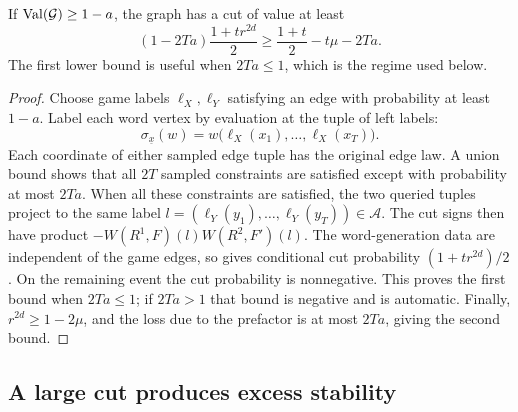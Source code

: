 \begin{lemma}[Completeness]\label{lem:completeness}
If $\operatorname{Val}(\mathcal G)\ge1-a$, the graph has a cut of value at least
\begin{equation}\label{eq:completeness}
 (1-2Ta)\frac{1+t r^{2d}}2
 \ge\frac{1+t}{2}-t\mu-2Ta.
\end{equation}
The first lower bound is useful when $2Ta\le1$, which is the regime used
below.
\end{lemma}

\begin{proof}
Choose game labels $\ell_X,\ell_Y$ satisfying an edge with probability at
least $1-a$. Label each word vertex by evaluation at the tuple of left
labels:
\[
 \sigma_{\underline x}(w)=
 w\bigl(\ell_X(x_1),\ldots,\ell_X(x_T)\bigr).
\]
Each coordinate of either sampled edge tuple has the original edge law.
A union bound shows that all $2T$ sampled constraints are satisfied except
with probability at most $2Ta$. When all these constraints are satisfied,
the two queried tuples
project to the same label
$l=(\ell_Y(y_1),\ldots,\ell_Y(y_T))\in\mathcal A$.
The cut signs then have product
$-W(R^1,F)(l)W(R^2,F')(l)$. The word-generation data are independent of
the game edges, so  gives conditional cut
probability $(1+t r^{2d})/2$. On the remaining event the cut probability
is nonnegative. This proves the first bound when $2Ta\le1$; if $2Ta>1$
that bound is negative and is automatic. Finally,
$r^{2d}\ge1-2\mu$, and the loss due to the prefactor is at most $2Ta$,
giving the second bound.
\end{proof}

\subsection{A large cut produces excess stability}

